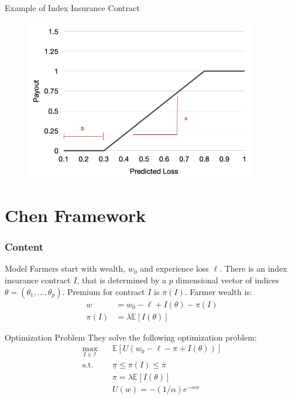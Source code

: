 \documentclass{beamer}
\begin{document}
\begin{frame}{Example of Index Insurance Contract}
    \begin{figure}
        \includegraphics[width=0.9\textwidth]{../../../output/figures/Presentation/sample_insurance_contract.png}
    \end{figure}
\end{frame}

\section{Chen Framework}
\begin{frame}
    \frametitle{Content}
    \tableofcontents[currentsection]
  \end{frame}

  
\begin{frame}{Model}
    Farmers start with wealth, $w_0$ and experience loss $\ell$. There is an index insurance contract $I$, that is determined by a $p$ dimensional vector of indices $\theta = (\theta_1,...,\theta_p)$. Premium for contract $I$ is $\pi(I)$. Farmer wealth is: 
    \begin{align*}
        w &= w_0 -\ell + I(\theta) -\pi(I)\\
        \pi(I) &= \lambda \mathbb{E}[I(\theta)]
    \end{align*}
\end{frame}

\begin{frame}{Optimization Problem}
    They solve the following optimization problem: 
    \begin{align}
        \max_{I \in \mathcal{I}}  & \quad \mathbb{E} \left [ U \left ( w_0 - \ell - \pi + I(\theta) \right ) \right ]\nonumber \\
        \text{s.t.} & \quad \underline{\pi} \leq \pi(I) \leq \overline{\pi}\\
        & \quad \pi = \lambda \mathbb{E}\left [ I(\theta) \right ] \\
        & \quad U \left (w \right ) = -(1/\alpha)e^{-\alpha w} 
    \end{align}
\end{frame}
\end{document}
